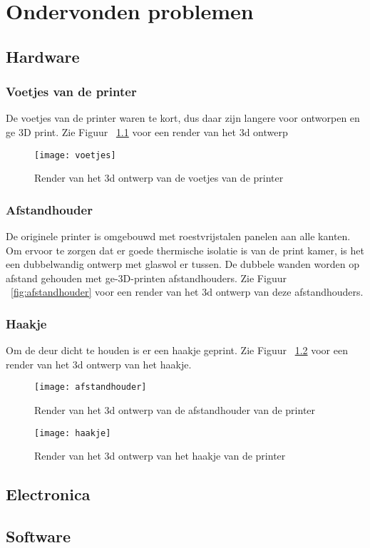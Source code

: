 \chapter{Ondervonden problemen}
\label{Ondervonden_problemen}

\section{Hardware}

\subsection{Voetjes van de printer}

De voetjes van de printer waren te kort, dus daar zijn langere voor
ontworpen en ge 3D print. Zie Figuur ~\ref{fig:voetjes} voor een render van
het 3d ontwerp

\begin{figure}[h]
    \centerline{\texttt{[image: voetjes]}}
    \caption{Render van het 3d ontwerp van de voetjes van de printer}
    \label{fig:voetjes}
\end{figure}

\subsection{Afstandhouder}

De originele printer is omgebouwd met roestvrijstalen panelen aan alle kanten.
Om ervoor te zorgen dat er goede thermische isolatie is van de print kamer, is
het een dubbelwandig ontwerp met glaswol er tussen. De dubbele wanden worden op
afstand gehouden met ge-3D-printen afstandhouders. Zie Figuur
~\ref{fig:afstandhouder} voor een render van het 3d ontwerp van deze
afstandhouders.

\subsection{Haakje}

Om de deur dicht te houden is er een haakje geprint. Zie Figuur
~\ref{fig:haakje} voor een render van het 3d ontwerp van het haakje.

\begin{figure}[h]
    \centering
    \begin{minipage}{0.45\textwidth}
        \centerline{\texttt{[image: afstandhouder]}}
        \caption{Render van het 3d ontwerp van de afstandhouder van de printer}
        \label{fig:afstandhouder}
    \end{minipage}\hfill
    \begin{minipage}{0.45\textwidth}
        \centerline{\texttt{[image: haakje]}}
        \caption{Render van het 3d ontwerp van het haakje van de printer}
        \label{fig:haakje}
    \end{minipage}
\end{figure}


\section{Electronica}

\section{Software}


